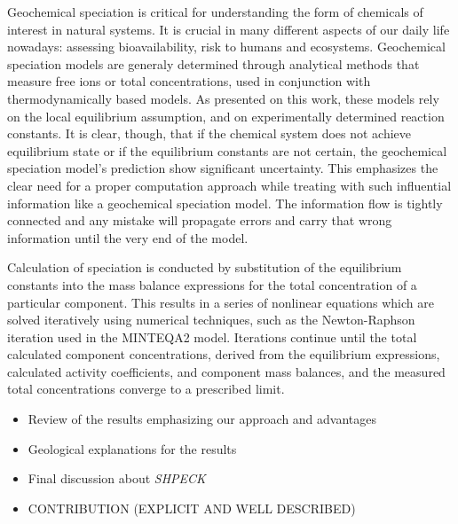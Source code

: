 \documentclass[ppgc,mestrado,english]{iiufrgs}
\begin{document}
Geochemical speciation is critical for understanding the form of chemicals of interest in natural systems. It is crucial in many different aspects of our daily life nowadays: assessing bioavailability, risk to humans and ecosystems. Geochemical speciation models are generaly determined through analytical methods that measure free ions or total concentrations, used in conjunction with thermodynamically based models. As presented on this work, these models rely on the local equilibrium assumption, and on experimentally determined reaction constants. It is clear, though, that if the chemical system does not achieve equilibrium state or if the equilibrium constants are not certain, the geochemical speciation model's prediction show significant uncertainty.
This emphasizes the clear need for a proper computation approach while treating with such influential information like a geochemical speciation model. The information flow is tightly connected and any mistake will propagate errors and carry that wrong information until the very end of the model.

Calculation of speciation is conducted by substitution of the equilibrium constants into the mass balance expressions for the total concentration of a particular component. This results in a series of nonlinear equations which are solved iteratively using numerical techniques, such as the Newton-Raphson iteration used in the MINTEQA2 model. Iterations continue until the total calculated component concentrations, derived from the equilibrium expressions, calculated activity coefficients, and component mass balances, and the measured total concentrations converge to a prescribed limit.

\begin{itemize}
\item Review of the results emphasizing our approach and advantages
\item  Geological explanations for the results
\item  Final discussion about \emph{SHPECK}
\item  CONTRIBUTION (EXPLICIT AND WELL DESCRIBED) 
\end{itemize}
\end{document}

